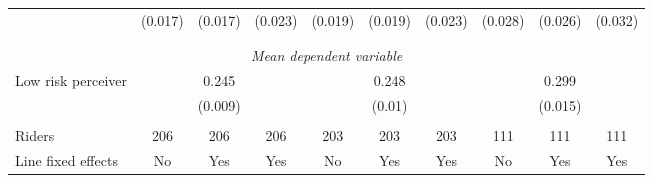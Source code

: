 \begin{tabular}{l*{9}{c}}
                    &     (0.017)         &     (0.017)         &     (0.023)         &     (0.019)         &     (0.019)         &     (0.023)         &     (0.028)         &     (0.026)         &     (0.032)         \\
\\[-1.8ex] \hline \\[-1.8ex] \multicolumn{10}{c}{\textit{Mean dependent variable}} \\ Low risk perceiver & \multicolumn{3}{c}{0.245}  & \multicolumn{3}{c}{0.248} & \multicolumn{3}{c}{0.299} \\ & \multicolumn{3}{c}{(0.009)}  & \multicolumn{3}{c}{(0.01)} & \multicolumn{3}{c}{(0.015)} \\\\[-1ex] 
Riders              &         206         &         206         &         206         &         203         &         203         &         203         &         111         &         111         &         111         \\
Line fixed effects  &          No         &         Yes         &         Yes         &          No         &         Yes         &         Yes         &          No         &         Yes         &         Yes         \\


\end{tabular}
